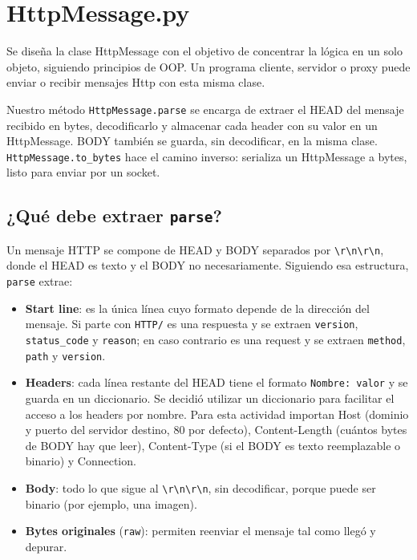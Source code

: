 \documentclass[
	spanish, %
	letterpaper, oneside
]{article}
\newcommand{\code}[1]{\texttt{#1}}    %
\newcommand{\hdr}[1]{#1}              %
\begin{document}
\templatePortrait

\templatePagecfg


\templateIndex

\templateFinalcfg


\section{HttpMessage.py}
Se diseña la clase HttpMessage con el objetivo de concentrar la lógica en un solo objeto, siguiendo principios de OOP.
Un programa cliente, servidor o proxy puede enviar o recibir mensajes Http con esta misma clase.

Nuestro método \code{HttpMessage.parse} se encarga de extraer el HEAD del mensaje recibido en bytes, decodificarlo y almacenar cada header con su valor en un HttpMessage.
BODY también se guarda, sin decodificar, en la misma clase. \code{HttpMessage.to\_bytes} hace el camino inverso: serializa un HttpMessage a bytes, listo para enviar por un socket.
\subsection{¿Qué debe extraer \code{parse}?}
Un mensaje HTTP se compone de HEAD y BODY separados por \verb|\r\n\r\n|, donde el HEAD es texto y el BODY no necesariamente.
Siguiendo esa estructura, \code{parse} extrae:

\begin{itemize}
	\item \textbf{Start line}: es la única línea cuyo formato depende de la dirección del mensaje. Si parte con \code{HTTP/} es una respuesta y se extraen \code{version}, \code{status\_code} y \code{reason}; en caso contrario es una request y se extraen \code{method}, \code{path} y \code{version}.
	\item \textbf{Headers}: cada línea restante del HEAD tiene el formato \code{Nombre: valor} y se guarda en un diccionario. Se decidió utilizar un diccionario para facilitar el acceso a los headers por nombre. Para esta actividad importan \hdr{Host} (dominio y puerto del servidor destino, 80 por defecto), \hdr{Content-Length} (cuántos bytes de BODY hay que leer), \hdr{Content-Type} (si el BODY es texto reemplazable o binario) y \hdr{Connection}.
	\item \textbf{Body}: todo lo que sigue al \verb|\r\n\r\n|, sin decodificar, porque puede ser binario (por ejemplo, una imagen).
	\item \textbf{Bytes originales} (\code{raw}): permiten reenviar el mensaje tal como llegó y depurar.
\end{itemize}
\end{document}

